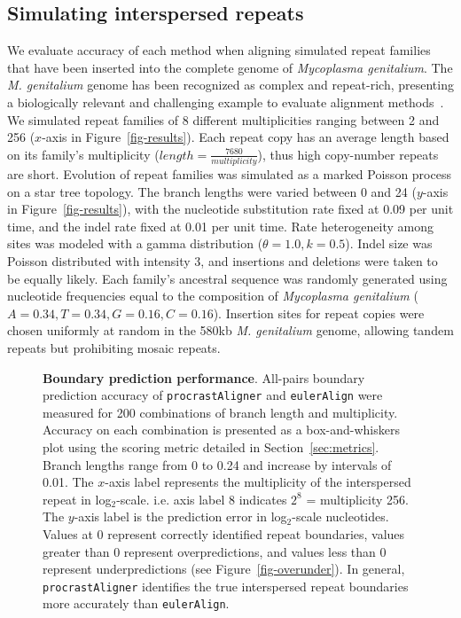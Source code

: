 \documentclass[10pt,journal,letterpaper,compsoc,peerreview]{IEEEtran}
\begin{document}
\subsection{Simulating interspersed repeats}
We evaluate accuracy of each method when aligning simulated repeat
families that have been inserted into the complete genome of
\emph{Mycoplasma genitalium}. The \emph{M. genitalium} genome has been recognized
as complex and repeat-rich, presenting a biologically
relevant and challenging example to evaluate alignment
methods~\cite{ref-mycoplasma}. We simulated repeat families of 8
different multiplicities ranging between 2 and 256 ($x$-axis in
Figure~\ref{fig-results}).  Each repeat copy has an average length
based on its family's multiplicity
($length=\frac{7680}{multiplicity}$), thus high copy-number repeats
are short.  Evolution of repeat families was simulated as a marked
Poisson process on a star tree
topology.  The branch lengths were varied between 0 and 24 ($y$-axis
in Figure~\ref{fig-results}), with the nucleotide substitution rate
fixed at 0.09 per unit time, and the indel rate fixed at 0.01 per
unit time.  Rate heterogeneity among sites was modeled with a gamma
distribution ($\theta = 1.0, k = 0.5$).  Indel size was
Poisson distributed with intensity 3, and insertions and deletions
were taken to be equally likely.  Each family's ancestral
sequence was randomly generated using nucleotide frequencies equal to
the composition of \emph{Mycoplasma genitalium}
($A=0.34,T=0.34,G=0.16,C=0.16$). Insertion sites for repeat copies
were chosen uniformly at random in the 580kb \textit{M. genitalium} genome,
allowing tandem repeats but prohibiting mosaic repeats.
\begin{figure*}[ht!]
\centering
{}
\caption[Boundary prediction performance]%
{\textbf{Boundary prediction performance}. All-pairs boundary prediction accuracy of \texttt{procrastAligner} and \texttt{eulerAlign} were measured for 200 combinations of branch length and multiplicity.  Accuracy on each combination is presented as a box-and-whiskers plot using the scoring metric detailed in Section~\ref{sec:metrics}.  Branch lengths range from 0 to 0.24 and increase by intervals of 0.01.  The $x$-axis label represents the multiplicity of the interspersed repeat in log$_2$-scale. i.e. axis label 8 indicates $2^{8}$ = multiplicity 256. The $y$-axis label is the prediction error in log$_2$-scale nucleotides. Values at 0 represent correctly identified repeat boundaries, values greater than 0 represent overpredictions, and values less than 0 represent underpredictions (see Figure~\ref{fig-overunder}). In general, \texttt{procrastAligner} identifies the true interspersed repeat boundaries more accurately than \texttt{eulerAlign}.}
\label{fig-boundary}
\end{figure*}
\end{document}
